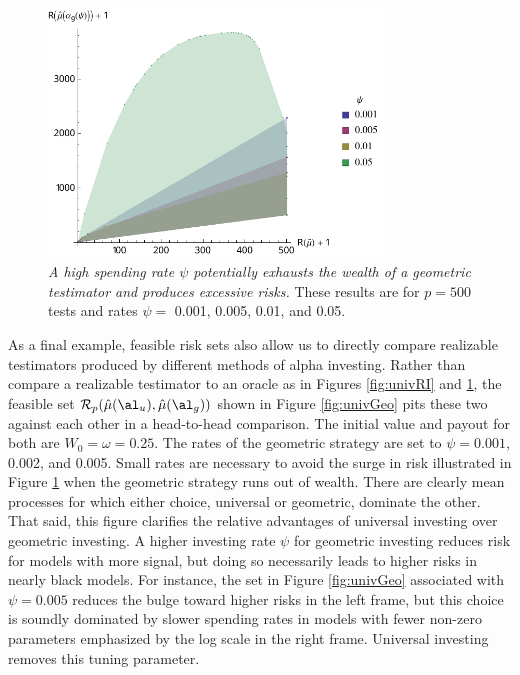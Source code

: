 \documentclass[12pt]{article}
\begin{document}
\begin{figure}
 \caption{ \label{fig:geo} {\sl A high spending rate $\psi$ potentially exhausts the wealth of a geometric testimator and produces excessive risks.}  These results are for $p=500$ tests and rates $\psi=$ 0.001, 0.005, 0.01, and 0.05.  }

 \vspace{0.1in}
 \centerline{
   \includegraphics[width=3.5in]{figures/geom}     }
 \vspace{0.2in}
\end{figure}


 As a final example, feasible risk sets also allow us to directly compare
 realizable testimators produced by different methods of alpha investing.
  Rather than compare a realizable testimator to an oracle
 as in Figures \ref{fig:univRI} and \ref{fig:geo}, the feasible set ${\cal R}_p (\hat\mu(\al_u),
 \hat\mu(\al_g))$ shown in Figure \ref{fig:univGeo} pits these two against each
 other in a head-to-head comparison.  The initial value and payout for both are
 $W_0 = \omega = 0.25$.  The rates of the geometric strategy are set to
 $\psi=0.001$, 0.002, and 0.005.  Small rates are necessary to avoid the surge
 in risk illustrated in Figure \ref{fig:geo} when the geometric strategy runs
 out of wealth.  There are clearly mean processes for which either choice,
 universal or geometric, dominate the other.  That said, this figure clarifies
 the relative advantages of universal investing over geometric investing.  
 A higher investing rate $\psi$ for geometric investing
 reduces risk for models with more signal, but doing so necessarily leads to
 higher risks in nearly black models.  For instance, the set in Figure
 \ref{fig:univGeo} associated with $\psi = 0.005$ reduces the bulge toward higher
 risks in the left frame, but this choice is soundly dominated by slower
 spending rates in models with fewer non-zero parameters emphasized by the log scale
 in the right frame.  Universal investing removes this tuning parameter.
\end{document}
